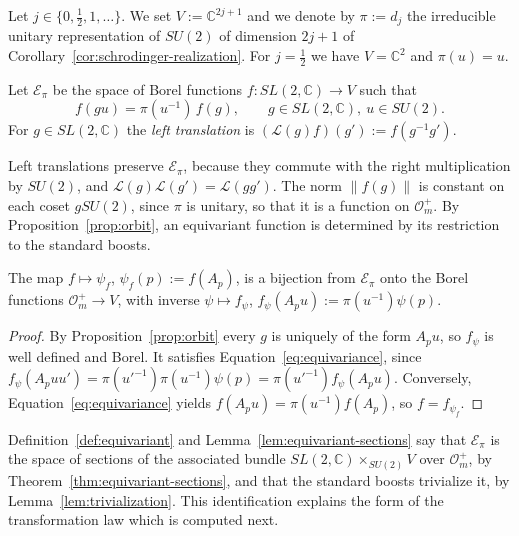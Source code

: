 	\begin{definition}\label{def:spin-data}
		Let $j\in\{0,\frac12,1,\dots\}$. We set $V:=\mathbb{C}^{2j+1}$ and we denote by $\pi:=d_j$ the irreducible unitary representation of $SU(2)$ of dimension $2j+1$ of Corollary~\ref{cor:schrodinger-realization}. For $j=\frac12$ we have $V=\mathbb{C}^2$ and $\pi(u)=u$.
	\end{definition}
	
	\begin{definition}\label{def:equivariant}
		Let $\mathcal{E}_\pi$ be the space of Borel functions $f:SL(2,\mathbb{C})\to V$ such that
		\begin{equation}\label{eq:equivariance}
			f(gu)=\pi(u^{-1})\,f(g), \qquad g\in SL(2,\mathbb{C}),\ u\in SU(2).
		\end{equation}
		For $g\in SL(2,\mathbb{C})$ the \emph{left translation} is $(\mathcal{L}(g)f)(g'):=f(g^{-1}g')$.
	\end{definition}
	
	Left translations preserve $\mathcal{E}_\pi$, because they commute with the right multiplication by $SU(2)$, and $\mathcal{L}(g)\mathcal{L}(g')=\mathcal{L}(gg')$. The norm $\|f(g)\|$ is constant on each coset $gSU(2)$, since $\pi$ is unitary, so that it is a function on $\mathcal{O}_m^+$. By Proposition~\ref{prop:orbit}, an equivariant function is determined by its restriction to the standard boosts.
	
	\begin{lemma}\label{lem:equivariant-sections}
		The map $f\mapsto\psi_f$, $\psi_f(p):=f(A_p)$, is a bijection from $\mathcal{E}_\pi$ onto the Borel functions $\mathcal{O}_m^+\to V$, with inverse $\psi\mapsto f_\psi$, $f_\psi(A_pu):=\pi(u^{-1})\psi(p)$.
	\end{lemma}
	
	\begin{proof}
		By Proposition~\ref{prop:orbit} every $g$ is uniquely of the form $A_pu$, so $f_\psi$ is well defined and Borel. It satisfies Equation~\eqref{eq:equivariance}, since $f_\psi(A_puu')=\pi(u'^{-1})\pi(u^{-1})\psi(p)=\pi(u'^{-1})f_\psi(A_pu)$. Conversely, Equation~\eqref{eq:equivariance} yields $f(A_pu)=\pi(u^{-1})f(A_p)$, so $f=f_{\psi_f}$.
	\end{proof}
	
	\noindent Definition~\ref{def:equivariant} and Lemma~\ref{lem:equivariant-sections} say that $\mathcal{E}_\pi$ is the space of sections of the associated bundle $SL(2,\mathbb{C})\times_{SU(2)}V$ over $\mathcal{O}_m^+$, by Theorem~\ref{thm:equivariant-sections}, and that the standard boosts trivialize it, by Lemma~\ref{lem:trivialization}. This identification explains the form of the transformation law which is computed next.
	
